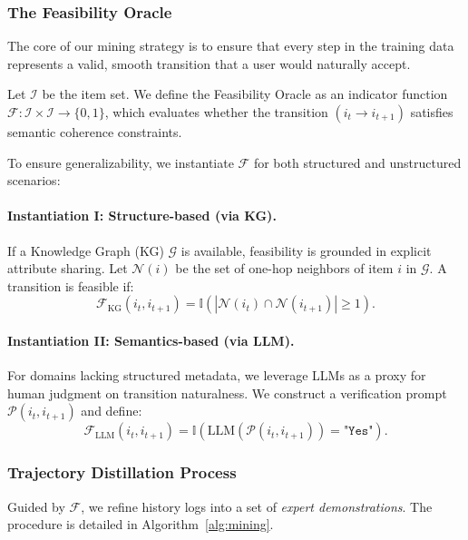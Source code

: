 \subsubsection{The Feasibility Oracle}
The core of our mining strategy is to ensure that every step in the training data represents a valid, smooth transition that a user would naturally accept.

\begin{definition}
Let $\mathcal{I}$ be the item set. We define the Feasibility Oracle as an indicator function $\mathcal{F}: \mathcal{I} \times \mathcal{I} \to \{0, 1\}$, which evaluates whether the transition $(i_t \to i_{t+1})$ satisfies semantic coherence constraints.
\end{definition}

To ensure generalizability, we instantiate $\mathcal{F}$ for both structured and unstructured scenarios:

\paragraph{Instantiation I: Structure-based (via KG).}
If a Knowledge Graph (KG) $\mathcal{G}$ is available, feasibility is grounded in explicit attribute sharing. Let $\mathcal{N}(i)$ be the set of one-hop neighbors of item $i$ in $\mathcal{G}$. A transition is feasible if:
\begin{equation}
    \mathcal{F}_{\text{KG}}(i_t, i_{t+1}) = \mathbb{I}(|\mathcal{N}(i_t) \cap \mathcal{N}(i_{t+1})| \ge 1).
\end{equation}

\paragraph{Instantiation II: Semantics-based (via LLM).}
For domains lacking structured metadata, we leverage LLMs as a proxy for human judgment on transition naturalness. We construct a verification prompt $\mathcal{P}(i_t, i_{t+1})$ and define:
\begin{equation}
    \mathcal{F}_{\text{LLM}}(i_t, i_{t+1}) = \mathbb{I}(\text{LLM}(\mathcal{P}(i_t, i_{t+1})) = \texttt{"Yes"}).
\end{equation}

\subsubsection{Trajectory Distillation Process}
Guided by $\mathcal{F}$, we refine history logs into a set of \textit{expert demonstrations}. The procedure is detailed in Algorithm~\ref{alg:mining}.

